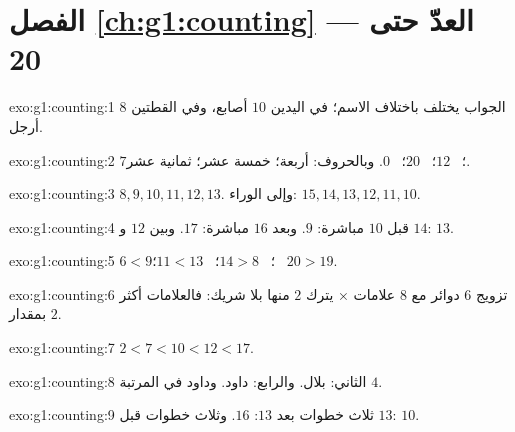 \section*{الفصل \ref{ch:g1:counting} --- العدّ حتى 20}

\begin{solution}{exo:g1:counting:1}
الجواب يختلف باختلاف الاسم؛ في اليدين $10$ أصابع، وفي القطتين
$8$ أرجل.
\end{solution}

\begin{solution}{exo:g1:counting:2}
$7$؛ \ $12$؛ \ $20$؛ \ $0$. وبالحروف: أربعة؛ خمسة عشر؛ ثمانية عشر.
\end{solution}

\begin{solution}{exo:g1:counting:3}
$8, 9, 10, 11, 12, 13$. وإلى الوراء: $15, 14, 13, 12, 11, 10$.
\end{solution}

\begin{solution}{exo:g1:counting:4}
قبل $10$ مباشرة: $9$. وبعد $16$ مباشرة: $17$. وبين $12$
و $14$: $13$.
\end{solution}

\begin{solution}{exo:g1:counting:5}
$6 < 9$؛ \ $14 > 8$؛ \ $11 < 13$؛ \ $20 > 19$.
\end{solution}

\begin{solution}{exo:g1:counting:6}
تزويج $6$ دوائر مع $8$ علامات × يترك $2$ منها بلا
شريك: فالعلامات أكثر بمقدار $2$.
\end{solution}

\begin{solution}{exo:g1:counting:7}
$2 < 7 < 10 < 12 < 17$.
\end{solution}

\begin{solution}{exo:g1:counting:8}
الثاني: بلال. والرابع: داود. وداود في المرتبة $4$.
\end{solution}

\begin{solution}{exo:g1:counting:9}
ثلاث خطوات بعد $13$: $16$. وثلاث خطوات قبل $13$: $10$.
\end{solution}
